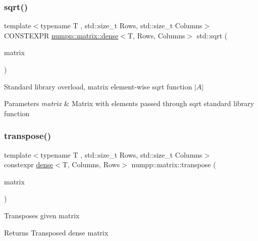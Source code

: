 \subsubsection{\texorpdfstring{sqrt()}{sqrt()}}
{\footnotesize\ttfamily template$<$typename T , std\+::size\+\_\+t Rows, std\+::size\+\_\+t Columns$>$ \\
C\+O\+N\+S\+T\+E\+X\+PR \hyperlink{classnumpp_1_1matrix_1_1dense}{numpp\+::matrix\+::dense}$<$T, Rows, Columns$>$ std\+::sqrt (\begin{DoxyParamCaption}\item[{const \hyperlink{classnumpp_1_1matrix_1_1dense}{numpp\+::matrix\+::dense}$<$ T, Rows, Columns $>$ \&}]{matrix }\end{DoxyParamCaption})}

Standard library overload, matrix element-\/wise sqrt function $|A|$


\begin{DoxyParams}{Parameters}
{\em matrix} & Matrix with elements passed through sqrt standard library function\\
\hline
\end{DoxyParams}
\mbox{\label{group__numpp__structures__matrices__dense_ga07f80d900be174247ad3a3c42e9244fd}} 
\subsubsection{\texorpdfstring{transpose()}{transpose()}}
{\footnotesize\ttfamily template$<$typename T , std\+::size\+\_\+t Rows, std\+::size\+\_\+t Columns$>$ \\
constexpr \hyperlink{classnumpp_1_1matrix_1_1dense}{dense}$<$T, Columns, Rows$>$ numpp\+::matrix\+::transpose (\begin{DoxyParamCaption}\item[{const \hyperlink{classnumpp_1_1matrix_1_1dense}{dense}$<$ T, Rows, Columns $>$ \&}]{matrix }\end{DoxyParamCaption})}

Transposes given matrix \begin{DoxyReturn}{Returns}
Transposed dense matrix
\end{DoxyReturn}
